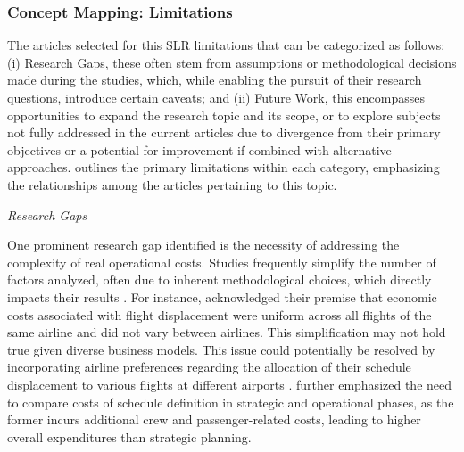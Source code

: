 \subsubsection{Concept Mapping: Limitations}

The articles selected for this \acrfull{SLR} limitations that can be categorized as follows: (i) Research Gaps, these often stem from assumptions or methodological decisions made during the studies, which, while enabling the pursuit of their research questions, introduce certain caveats; and (ii) Future Work,  this encompasses opportunities to expand the research topic and its scope, or to explore subjects not fully addressed in the current articles due to divergence from their primary objectives or a potential for improvement if combined with alternative approaches.
 outlines the primary limitations within each category, emphasizing the relationships among the articles pertaining to this topic.


%

\hfill \break
\textit{Research Gaps}
\hfill \break

One prominent research gap identified is the necessity of addressing the complexity of real operational costs. Studies frequently simplify the number of factors analyzed, often due to inherent methodological choices, which directly impacts their results \cite{wang_distribution_2022}. For instance,  acknowledged their premise that economic costs associated with flight displacement were uniform across all flights of the same airline and did not vary between airlines. This simplification may not hold true given diverse business models. This issue could potentially be resolved by incorporating airline preferences regarding the allocation of their schedule displacement to various flights at different airports \cite{keskin_optimal_2023, pellegrini_sosta_2017}.  further emphasized the need to compare costs of schedule definition in strategic and operational phases, as the former incurs additional crew and passenger-related costs, leading to higher overall expenditures than strategic planning.

